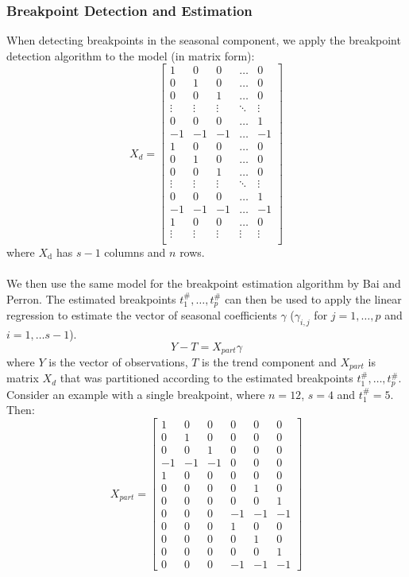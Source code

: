 \documentclass[main.tex]{subfiles}
\begin{document}
\subsubsection{Breakpoint Detection and Estimation}
When detecting breakpoints in the seasonal component, we apply the breakpoint
detection algorithm to the model (in matrix form):
\[
X_d =
\begin{bmatrix}
 1 & 0 & 0 & \hdots & 0\\
 0 & 1 & 0 & \hdots & 0 \\
 0 & 0 & 1 & \hdots & 0 \\
\vdots & \vdots & \vdots & \ddots & \vdots \\
 0 & 0 & 0 & \hdots & 1 \\
 -1 & -1 & -1 & \hdots & -1 \\
 1 & 0 & 0 & \hdots & 0\\
 0 & 1 & 0 & \hdots & 0 \\
 0 & 0 & 1 & \hdots & 0 \\
\vdots & \vdots & \vdots & \ddots & \vdots \\
 0 & 0 & 0 & \hdots & 1 \\
 -1 & -1 & -1 & \hdots & -1 \\
 1 & 0 & 0 & \hdots & 0\\
\vdots & \vdots & \vdots & \vdots & \vdots \\
\end{bmatrix}
\]
where $X_\text{d}$ has $s-1$ columns and $n$ rows.\\\\
We then use the same model for the breakpoint estimation algorithm by Bai and Perron.
The estimated breakpoints
$t_1^{\#},\hdots, t_p^{\#}$ can then be used to apply the linear regression to estimate
the vector of seasonal coefficients $\gamma$ ($\gamma_{i,j}$ for
$j = 1, \hdots, p$ and $i = 1,\hdots s-1$).
\[
Y - T = X_{part} \gamma
\]
where $Y$ is the vector of observations, $T$ is the trend component and
$X_{part}$ is matrix $X_d$ that was partitioned according to the
estimated breakpoints $t_1^{\#},\hdots, t_p^{\#}$. Consider an example with a
single breakpoint, where $n = 12$, $s=4$ and $t_1^{\#} = 5$. Then:
\[
X_{part} =
\begin{bmatrix}
  1 & 0 & 0 & 0 & 0 & 0\\
  0 & 1 & 0 & 0 & 0 & 0\\
  0 & 0 & 1 & 0 & 0 & 0\\
  -1 & -1 & -1 & 0 & 0 & 0\\
  1 & 0 & 0 & 0 & 0 & 0\\
  0 & 0 & 0 & 0 & 1 & 0\\
  0 & 0 & 0 & 0 & 0 & 1\\
  0 & 0 & 0 & -1 & -1 & -1\\
  0 & 0 & 0 & 1 & 0 & 0\\
  0 & 0 & 0 & 0 & 1 & 0\\
  0 & 0 & 0 & 0 & 0 & 1\\
  0 & 0 & 0 & -1 & -1 & -1
\end{bmatrix}
\]
\end{document}
